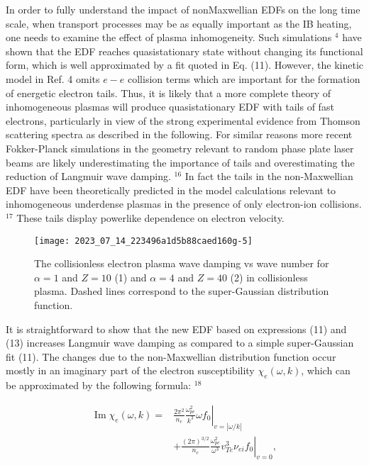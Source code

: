 \documentclass[oneside,onecolumn]{article}
\begin{document}
\begin{sloppypar}
 In order to fully understand the impact of nonMaxwellian EDFs on the long time scale, when transport processes may be as equally important as the IB heating, one needs to examine the effect of plasma inhomogeneity. Such simulations $^{4}$ have shown that the EDF reaches quasistationary state without changing its functional form, which is well approximated by a fit quoted in Eq. (11). However, the kinetic model in Ref. 4 omits $e-e$ collision terms which are important for the formation of energetic electron tails. Thus, it is likely that a more complete theory of inhomogeneous plasmas will produce quasistationary EDF with tails of fast electrons, particularly in view of the strong experimental evidence from Thomson scattering spectra as described in the following. For similar reasons more recent Fokker-Planck simulations in the geometry relevant to random phase plate laser beams are likely underestimating the importance of tails and overestimating the reduction of Langmuir wave damping. ${ }^{16}$ In fact the tails in the non-Maxwellian EDF have been theoretically predicted in the model calculations relevant to inhomogeneous underdense plasmas in the presence of only electron-ion collisions. ${ }^{17}$ These tails display powerlike dependence on electron velocity.
 
 \begin{figure}[tbp]
 	\centering
 	\texttt{[image: 2023\_07\_14\_223496a1d5b88caed160g-5]}
 	\caption{The collisionless electron plasma wave damping vs wave number for $\alpha=1$ and $Z=10$ (1) and $\alpha=4$ and $Z=40$ (2) in collisionless plasma. Dashed lines correspond to the super-Gaussian distribution function.}
 	\label{fig5.}
 \end{figure}
 
 It is straightforward to show that the new EDF based on expressions (11) and (13) increases Langmuir wave damping as compared to a simple super-Gaussian fit (11). The changes due to the non-Maxwellian distribution function occur mostly in an imaginary part of the electron susceptibility $\chi_{e}(\omega, k)$, which can be approximated by the following formula: ${ }^{18}$
 
 \begin{dmath}[compact]
 \begin{aligned}
 \operatorname{Im} \chi_{e}(\omega, k)= & \left.\frac{2 \pi^{2}}{n_{e}} \frac{\omega_{p e}^{2}}{k^{3}} \omega f_{0}\right|_{v=|\omega / k|} \\
 & +\left.\frac{(2 \pi)^{3 / 2}}{n_{e}} \frac{\omega_{p e}^{2}}{\omega^{3}} v_{T e}^{3} \nu_{e i} f_{0}\right|_{v=0},
 \end{aligned}
 \end{dmath}
 

\end{sloppypar}
\end{document}
